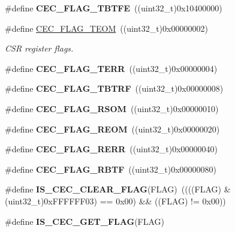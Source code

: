 \begin{DoxyCompactItemize}
\item 
\hypertarget{group__CEC__flags__definition_gaae90fd2f95085e113b6943bb35d899ba}{
\#define {\bfseries CEC\_\-FLAG\_\-TBTFE}~((uint32\_\-t)0x10400000)}
\label{group__CEC__flags__definition_gaae90fd2f95085e113b6943bb35d899ba}

\item 
\hypertarget{group__CEC__flags__definition_gad0adfb11294f562f2c8dc555f69e25e0}{
\#define \hyperlink{group__CEC__flags__definition_gad0adfb11294f562f2c8dc555f69e25e0}{CEC\_\-FLAG\_\-TEOM}~((uint32\_\-t)0x00000002)}
\label{group__CEC__flags__definition_gad0adfb11294f562f2c8dc555f69e25e0}

\begin{DoxyCompactList}\small\item\em CSR register flags. \item\end{DoxyCompactList}\item 
\hypertarget{group__CEC__flags__definition_ga7edc608ca7b4ea74dd4d795fa3214c11}{
\#define {\bfseries CEC\_\-FLAG\_\-TERR}~((uint32\_\-t)0x00000004)}
\label{group__CEC__flags__definition_ga7edc608ca7b4ea74dd4d795fa3214c11}

\item 
\hypertarget{group__CEC__flags__definition_gaeb02634fdd06f4ea0990e2cf23cf200e}{
\#define {\bfseries CEC\_\-FLAG\_\-TBTRF}~((uint32\_\-t)0x00000008)}
\label{group__CEC__flags__definition_gaeb02634fdd06f4ea0990e2cf23cf200e}

\item 
\hypertarget{group__CEC__flags__definition_ga4e352d4f48e3b197edf150860703d2bf}{
\#define {\bfseries CEC\_\-FLAG\_\-RSOM}~((uint32\_\-t)0x00000010)}
\label{group__CEC__flags__definition_ga4e352d4f48e3b197edf150860703d2bf}

\item 
\hypertarget{group__CEC__flags__definition_gaffeaec4eafbf1efbd88139b9bb0654a7}{
\#define {\bfseries CEC\_\-FLAG\_\-REOM}~((uint32\_\-t)0x00000020)}
\label{group__CEC__flags__definition_gaffeaec4eafbf1efbd88139b9bb0654a7}

\item 
\hypertarget{group__CEC__flags__definition_gac2376c2b958536ab414574f60cb5d75a}{
\#define {\bfseries CEC\_\-FLAG\_\-RERR}~((uint32\_\-t)0x00000040)}
\label{group__CEC__flags__definition_gac2376c2b958536ab414574f60cb5d75a}

\item 
\hypertarget{group__CEC__flags__definition_gae73c6ec73ab8ad57b18d3bd416baf2d3}{
\#define {\bfseries CEC\_\-FLAG\_\-RBTF}~((uint32\_\-t)0x00000080)}
\label{group__CEC__flags__definition_gae73c6ec73ab8ad57b18d3bd416baf2d3}

\item 
\hypertarget{group__CEC__flags__definition_ga418911667f82a12dd097f7fac7ad4e89}{
\#define {\bfseries IS\_\-CEC\_\-CLEAR\_\-FLAG}(FLAG)~((((FLAG) \& (uint32\_\-t)0xFFFFFF03) == 0x00) \&\& ((FLAG) != 0x00))}
\label{group__CEC__flags__definition_ga418911667f82a12dd097f7fac7ad4e89}

\item 
\#define {\bfseries IS\_\-CEC\_\-GET\_\-FLAG}(FLAG)
\end{DoxyCompactItemize}


